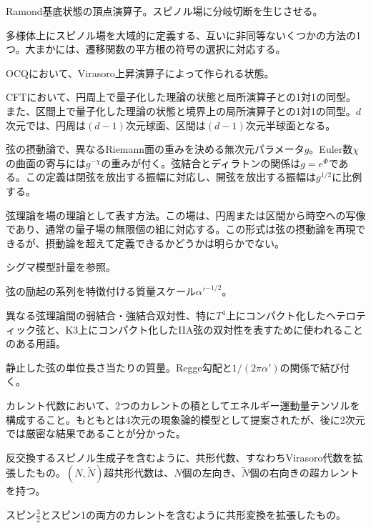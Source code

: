 {Ramond基底状態の頂点演算子。スピノル場に分岐切断を生じさせる。}

{多様体上にスピノル場を大域的に定義する、互いに非同等ないくつかの方法の1つ。大まかには、遷移関数の平方根の符号の選択に対応する。}

{OCQにおいて、Virasoro上昇演算子によって作られる状態。}

{CFTにおいて、円周上で量子化した理論の状態と局所演算子との1対1の同型。また、区間上で量子化した理論の状態と境界上の局所演算子との1対1の同型。$d$次元では、円周は$(d-1)$次元球面、区間は$(d-1)$次元半球面となる。}

{弦の摂動論で、異なるRiemann面の重みを決める無次元パラメータ$g$。Euler数$\chi$の曲面の寄与には$g^{-\chi}$の重みが付く。弦結合とディラトンの関係は$g=e^\Phi$である。この定義は閉弦を放出する振幅に対応し、開弦を放出する振幅は$g^{1/2}$に比例する。}

{弦理論を場の理論として表す方法。この場は、円周または区間から時空への写像であり、通常の量子場の無限個の組に対応する。この形式は弦の摂動論を再現できるが、摂動論を超えて定義できるかどうかは明らかでない。}

{シグマ模型計量を参照。}

{弦の励起の系列を特徴付ける質量スケール$\alpha'^{-1/2}$。}

{異なる弦理論間の弱結合・強結合双対性、特に$T^4$上にコンパクト化したヘテロティック弦と、K3上にコンパクト化したIIA弦の双対性を表すために使われることのある用語。}

{静止した弦の単位長さ当たりの質量。Regge勾配と$1/(2\pi\alpha')$の関係で結び付く。}

{カレント代数において、2つのカレントの積としてエネルギー運動量テンソルを構成すること。もともとは4次元の現象論的模型として提案されたが、後に2次元では厳密な結果であることが分かった。}

{反交換するスピノル生成子を含むように、共形代数、すなわちVirasoro代数を拡張したもの。$(N,\widetilde N)$超共形代数は、$N$個の左向き、$\widetilde N$個の右向きの超カレントを持つ。}

{スピン$\frac32$とスピン1の両方のカレントを含むように共形変換を拡張したもの。}

